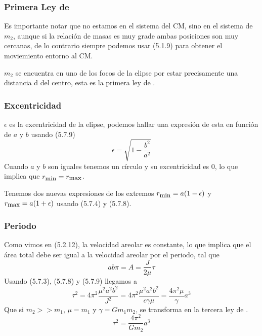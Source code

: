 \subsubsection{Primera Ley de }
Es importante notar que no estamos en el sistema del CM, sino en el sistema de $m_2$, aunque si la relación de masas es muy grade ambas posiciones son muy cercanas, de lo contrario siempre podemos usar (5.1.9) para obtener el moviemiento entorno al CM.

$m_2$ se encuentra en uno de los focos de la elipse por estar precisamente una distancia d del centro, esta es la primera ley de .

\subsubsection{Excentricidad}
$\epsilon$ es la excentricidad de la elipse, podemos hallar una expresión de esta en función de $a$ y $b$ usando (5.7.9)
\begin{equation} \label{5.1.12}
    \epsilon = \sqrt{1-\frac{b^2}{a^2}}
\end{equation} 
Cuando $a$ y $b$ son iguales tenemos un círculo y su excentricidad es 0, lo que implica que $r_{\mbox{\small min}} = r_{\mbox{\small max}}$.

Tenemos dos nuevas expresiones de los extremos $r_{\mbox{\small min}} = a (1-\epsilon)$ y  $r_{\mbox{\small max}} = a (1+\epsilon)$ usando (5.7.4) y (5.7.8).
\subsubsection{Periodo}
Como vimos en (5.2.12), la velocidad areolar es constante, lo que implica que el área total debe ser igual a la velocidad areolar por el periodo, tal que
\begin{equation} \label{5.1.13}
    a b \pi =A = \frac{J}{2 \mu} \tau
\end{equation} 
Usando (5.7.3), (5.7.8) y (5.7.9) llegamos a 
\begin{equation} \label{5.1.14}
    \tau^2 = 4 \pi^2 \frac{\mu^2 a^2 b^2}{J^2} = 4 \pi^2 \frac{\mu^2 a^2 b^2}{c \gamma \mu} =  \frac{4 \pi^2  \mu}{\gamma} a^3
\end{equation} 
Que si $m_2 >> m_1$, $\mu = m_1$ y $\gamma = G m_1 m_2 $, se transforma en la tercera ley de .
\begin{equation} \label{5.1.14}
    \tau^2 =\frac{4 \pi^2}{G m_2} a^3
\end{equation} 
